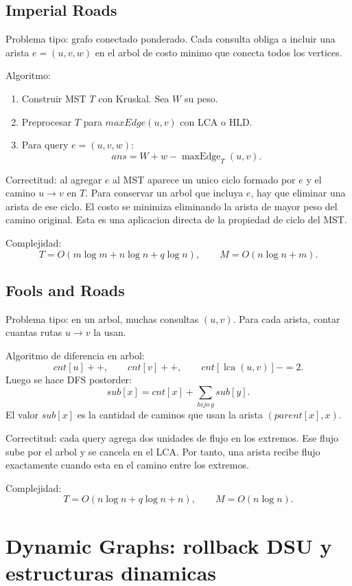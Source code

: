 \documentclass[10pt]{article}
\newcommand{\bigO}{O}
\newcommand{\lca}{\operatorname{lca}}
\begin{document}
\subsection{Imperial Roads}
Problema tipo: grafo conectado ponderado. Cada consulta obliga a incluir una arista \(e=(u,v,w)\) en el arbol
de costo minimo que conecta todos los vertices.

Algoritmo:
\begin{enumerate}
\item Construir MST \(T\) con Kruskal. Sea \(W\) su peso.
\item Preprocesar \(T\) para \(maxEdge(u,v)\) con LCA o HLD.
\item Para query \(e=(u,v,w)\):
\[
ans=W+w-\operatorname{maxEdge}_T(u,v).
\]
\end{enumerate}

Correctitud: al agregar \(e\) al MST aparece un unico ciclo formado por \(e\) y el camino \(u\to v\) en \(T\).
Para conservar un arbol que incluya \(e\), hay que eliminar una arista de ese ciclo. El costo se minimiza eliminando
la arista de mayor peso del camino original. Esta es una aplicacion directa de la propiedad de ciclo del MST.

Complejidad:
\[
T=\bigO(m\log m+n\log n+q\log n),\qquad M=\bigO(n\log n+m).
\]

\subsection{Fools and Roads}
Problema tipo: en un arbol, muchas consultas \((u,v)\). Para cada arista, contar cuantas rutas \(u\to v\) la usan.

Algoritmo de diferencia en arbol:
\[
cnt[u]++,\qquad cnt[v]++,\qquad cnt[\lca(u,v)]-=2.
\]
Luego se hace DFS postorder:
\[
sub[x]=cnt[x]+\sum_{hijo\ y} sub[y].
\]
El valor \(sub[x]\) es la cantidad de caminos que usan la arista \((parent[x],x)\).

Correctitud: cada query agrega dos unidades de flujo en los extremos. Ese flujo sube por el arbol y se cancela en
el LCA. Por tanto, una arista recibe flujo exactamente cuando esta en el camino entre los extremos.

Complejidad:
\[
T=\bigO(n\log n+q\log n+n),\qquad M=\bigO(n\log n).
\]

\newpage

\section{Dynamic Graphs: rollback DSU y estructuras dinamicas}
\end{document}
